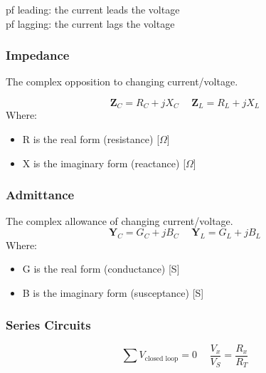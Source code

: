 \documentclass[twocolumn, 12pt]{article}
\begin{document}
{        \begin{center}
            pf leading: the current leads the voltage\\
            pf lagging: the current lags the voltage
        \end{center}
        

\subsubsection*{Impedance}
        The complex opposition to changing current/voltage.
    
    \begin{equation*}
        \textbf{Z}_C=R_C+jX_C \hspace{15pt} \textbf{Z}_L=R_L+jX_L
    \end{equation*}
        \noindent
        Where:
        \begin{itemize}
            \item R is the real form (resistance) [\(\Omega\)]
            \item X is the imaginary form (reactance) [\(\Omega\)]
        \end{itemize}
       
        
\subsubsection*{Admittance}
        The complex allowance of changing current/voltage.
        \begin{equation*}
            \textbf{Y}_C= G_C+jB_C \hspace{15pt} \textbf{Y}_L = G_L +jB_L
        \end{equation*}
        \noindent
        Where:
        \begin{itemize}
            \item G is the real form (conductance) [S]
            \item B is the imaginary form (susceptance) [S]
        \end{itemize}
        
        
        
\subsubsection*{Series Circuits} 

         \begin{equation*}
            \sum V_{\text{closed loop}}=0 \hspace{15pt} \frac{V_x}{V_S}=\frac{R_x}{R_T}
        \end{equation*}
        
}
\end{document}

